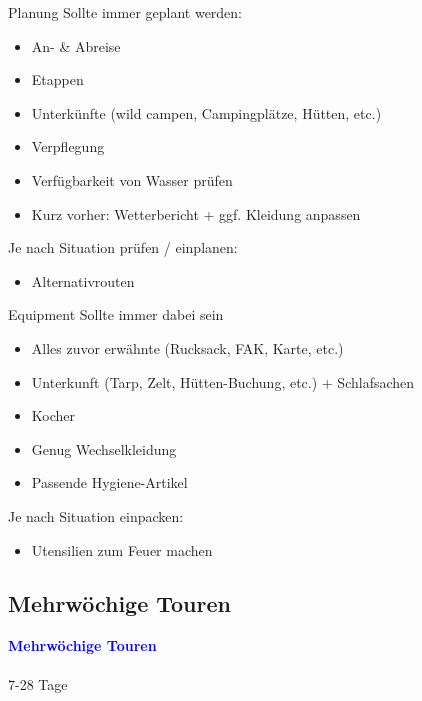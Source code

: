 \documentclass[aspectratio=169]{beamer}
\begin{document}
			\begin{frame}{Planung}
				Sollte immer geplant werden:
				\begin{itemize}
					\item An- \& Abreise
					\item Etappen
					\item Unterkünfte (wild campen, Campingplätze, Hütten, etc.)
					\item Verpflegung
					\item Verfügbarkeit von Wasser prüfen
					\item Kurz vorher: Wetterbericht + ggf. Kleidung anpassen
				\end{itemize}
				Je nach Situation prüfen / einplanen:
				\begin{itemize}
					\item Alternativrouten
				\end{itemize}
			\end{frame}
			
			\begin{frame}{Equipment}
				Sollte immer dabei sein
				\begin{itemize}
					\item Alles zuvor erwähnte (Rucksack, FAK, Karte, etc.)
					\item Unterkunft (Tarp, Zelt, Hütten-Buchung, etc.) + Schlafsachen
					\item Kocher
					\item Genug Wechselkleidung
					\item Passende Hygiene-Artikel
				\end{itemize}
				Je nach Situation einpacken:
				\begin{itemize}
					\item Utensilien zum Feuer machen
				\end{itemize}
			\end{frame}
		
		\subsection{Mehrwöchige Touren}
		
			\begin{frame}
				\vspace{1cm}
				\begin{center}
					\textcolor{blue}{\textbf{Mehrwöchige Touren}}
					\\\,\\
					{\scriptsize 7-28 Tage}
				\end{center}
			\end{frame}
		
\end{document}

